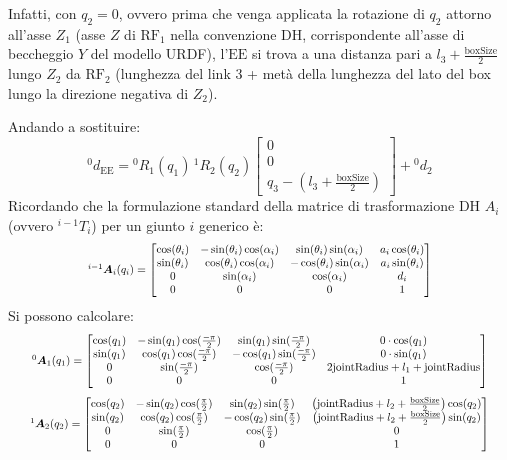 ﻿\documentclass[11pt, a4paper]{article}
\begin{document}
Infatti, con $q_{2} = 0$, ovvero prima che venga applicata la rotazione di $q_{2}$ attorno all'asse $Z_{1}$ (asse $Z$ di $\text{RF}_1$ nella convenzione DH, corrispondente all'asse di beccheggio $Y$ del modello URDF), l'$\text{EE}$ si trova a una distanza pari a $l_3 + \frac{\text{boxSize}}{2}$ lungo $Z_{2}$ da $\text{RF}_2$ (lunghezza del link 3 + metà della lunghezza del lato del box lungo la direzione negativa di $Z_{2}$).

Andando a sostituire:
\[
{}^{0}d_{\text{EE}} = {}^{0}R_{1}(q_1) \, {}^{1}R_{2}(q_2) \begin{bmatrix} 0 \\ 0 \\ q_3 - \left(l_3 + \frac{\text{boxSize}}{2}\right) \end{bmatrix} + {}^{0}d_{2}
\]
Ricordando che la formulazione standard della matrice di trasformazione DH $A_i$ (ovvero ${}^{i-1}T_{i}$) per un giunto $i$ generico è:
\[
\scalebox{0.8}{$
^{i - 1}\bm{A}_{i}(q_{i}) =
    \begin{bmatrix}
        \cos(\theta_i) & -\sin(\theta_i)\cos(\alpha_{i}) & \sin(\theta_i)\sin(\alpha_{i}) & a_{i}\cos(\theta_{i})\\
        \sin(\theta_i) & \cos(\theta_i)\cos(\alpha_{i}) & -\cos(\theta_i)\sin(\alpha_{i}) & a_{i}\sin(\theta_{i})\\
        0 & \sin(\alpha_{i}) & \cos(\alpha_{i}) & d_{i}\\
        0 & 0 & 0 & 1
    \end{bmatrix}
$}
\]
Si possono calcolare:
\[
\scalebox{0.8}{$
^{0}\bm{A}_{1}(q_{1}) =
    \begin{bmatrix}
        \cos(q_1) & -\sin(q_1)\cos(\frac{-\pi}{2}) & \sin(q_1)\sin(\frac{-\pi}{2}) & 0\cdot\cos(q_{1})\\
        \sin(q_1) & \cos(q_1)\cos(\frac{-\pi}{2}) & -\cos(q_1)\sin(\frac{-\pi}{2}) & 0\cdot\sin(q_{1})\\
        0 & \sin(\frac{-\pi}{2}) & \cos(\frac{-\pi}{2}) & 2\text{jointRadius} + l_{1} + \text{jointRadius}\\
        0 & 0 & 0 & 1
    \end{bmatrix}
$}
\]
\[
\scalebox{0.8}{$
^{1}\bm{A}_{2}(q_{2}) =
    \begin{bmatrix}
        \cos(q_2) & -\sin(q_2)\cos(\frac{\pi}{2}) & \sin(q_2)\sin(\frac{\pi}{2}) & \left(\text{jointRadius} + l_{2} + \frac{\text{boxSize}}{2}\right)\cos(q_{2})\\
        \sin(q_2) & \cos(q_2)\cos(\frac{\pi}{2}) & -\cos(q_2)\sin(\frac{\pi}{2}) & \left(\text{jointRadius} + l_{2} + \frac{\text{boxSize}}{2}\right)\sin(q_{2})\\
        0 & \sin(\frac{\pi}{2}) & \cos(\frac{\pi}{2}) & 0\\
        0 & 0 & 0 & 1
    \end{bmatrix}
$}
\]
\end{document}
